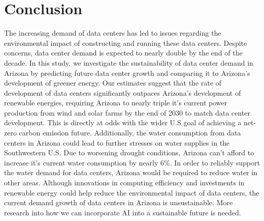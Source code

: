 \documentclass[letterpaper, 12 pt]{article}  %
\begin{document}
\section{Conclusion}
The increasing demand of data centers has led to issues regarding the environmental impact of constructing and running these data centers. Despite concerns, data center demand is expected to nearly double by the end of the decade. In this study, we investigate the sustainability of data center demand in Arizona by predicting future data center growth and comparing it to Arizona's development of greener energy. Our estimates suggest that the rate of development of data centers significantly outpaces Arizona's development of renewable energies, requiring Arizona to nearly triple it's current power production from wind and solar farms by the end of 2030 to match data center development. This is directly at odds with the wider U.S goal of achieving a net-zero carbon emission future. Additionally, the water consumption from data centers in Arizona could lead to further stresses on water supplies in the Southwestern U.S. Due to worsening drought conditions, Arizona can't afford to increase it's current water consumption by nearly 6\%. In order to reliably support the water demand for data centers, Arizona would be required to reduce water in other areas. 
Although innovations in computing efficiency and investments in renewable energy could help reduce the environmental impact of data centers, the current demand growth of data centers in Arizona is unsustainable. More research into how we can incorporate AI into a sustainable future is needed. 
\end{document}
